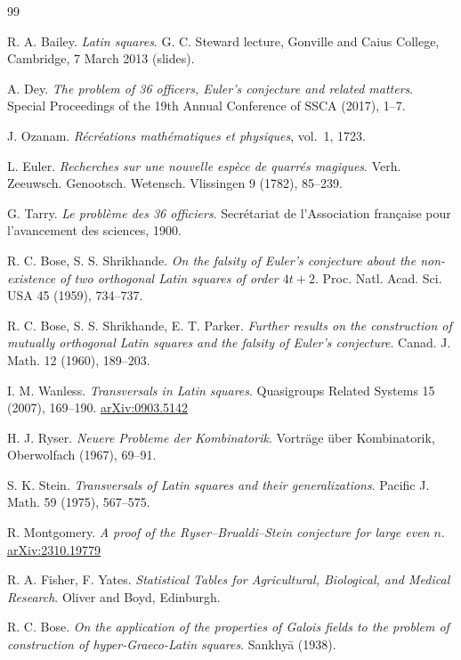 \begin{thebibliography}{99}

 R. A. Bailey. \emph{Latin squares}. G. C. Steward lecture, Gonville and Caius College, Cambridge, 7 March 2013 (slides).

 A. Dey. \emph{The problem of 36 officers, Euler's conjecture and related matters}. Special Proceedings of the 19th Annual Conference of SSCA (2017), 1--7.

 J. Ozanam. \emph{R\'ecr\'eations math\'ematiques et physiques}, vol.~1, 1723.

 L. Euler. \emph{Recherches sur une nouvelle esp\`ece de quarr\'es magiques}. Verh. Zeeuwsch. Genootsch. Wetensch. Vlissingen 9 (1782), 85--239.

 G. Tarry. \emph{Le probl\`eme des 36 officiers}. Secr\'etariat de l'Association fran\c{c}aise pour l'avancement des sciences, 1900.

 R. C. Bose, S. S. Shrikhande. \emph{On the falsity of Euler's conjecture about the non-existence of two orthogonal Latin squares of order $4t+2$}. Proc. Natl. Acad. Sci. USA 45 (1959), 734--737.

 R. C. Bose, S. S. Shrikhande, E. T. Parker. \emph{Further results on the construction of mutually orthogonal Latin squares and the falsity of Euler's conjecture}. Canad. J. Math. 12 (1960), 189--203.

 I. M. Wanless. \emph{Transversals in Latin squares}. Quasigroups Related Systems 15 (2007), 169--190. \href{https://arxiv.org/abs/0903.5142}{arXiv:0903.5142}

 H. J. Ryser. \emph{Neuere Probleme der Kombinatorik}. Vortr\"age \"uber Kombinatorik, Oberwolfach (1967), 69--91.

 S. K. Stein. \emph{Transversals of Latin squares and their generalizations}. Pacific J. Math. 59 (1975), 567--575.

 R. Montgomery. \emph{A proof of the Ryser--Brualdi--Stein conjecture for large even $n$}. \href{https://arxiv.org/abs/2310.19779}{arXiv:2310.19779}

 R. A. Fisher, F. Yates. \emph{Statistical Tables for Agricultural, Biological, and Medical Research}. Oliver and Boyd, Edinburgh.

 R. C. Bose. \emph{On the application of the properties of Galois fields to the problem of construction of hyper-Graeco-Latin squares}. Sankhy\=a (1938).


\end{thebibliography}
